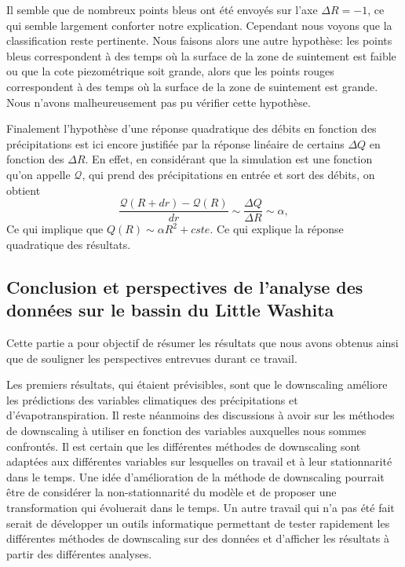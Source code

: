 \documentclass[a4paper,11pt]{article}
\numberwithin{equation}{section}
\begin{document}
Il semble que de nombreux points bleus ont été  envoyés sur l'axe $\Delta R=-1$, ce qui semble largement conforter notre explication. Cependant nous voyons que la classification reste pertinente. Nous faisons alors une autre hypothèse: les points bleus correspondent à des temps où la surface de la zone de suintement est faible ou que la cote piezométrique soit grande, alors que les points rouges correspondent à des temps où la surface de la zone de suintement est grande. Nous n'avons malheureusement pas pu vérifier cette hypothèse.

Finalement l'hypothèse d'une réponse quadratique des débits en fonction des précipitations est ici encore justifiée par la réponse linéaire de certains $\Delta Q$ en fonction des $\Delta R$.
En effet, en considérant que la simulation est une fonction qu'on appelle $\mathcal{Q}$, qui prend des précipitations en entrée et sort des débits, on obtient \[\frac{\mathcal{Q}(R+dr)-\mathcal{Q}(R)}{dr}\sim \frac{\Delta Q}{\Delta R}\sim \alpha,\]
Ce qui implique que $Q(R)\sim \alpha R^2 + cste$.
Ce qui explique la réponse quadratique des résultats.


\subsection{Conclusion et perspectives de l'analyse des données sur le bassin du Little Washita} 

Cette partie a pour objectif de résumer les résultats que nous avons obtenus ainsi que de souligner les perspectives entrevues durant ce travail.

\vspace{0.7cm}

Les premiers résultats, qui étaient prévisibles, sont que le downscaling améliore les prédictions des variables climatiques des précipitations et d'évapotranspiration. Il reste néanmoins des discussions à avoir sur les méthodes de downscaling à utiliser en fonction des variables auxquelles nous sommes confrontés. Il est certain que les différentes méthodes de downscaling sont adaptées aux différentes variables sur lesquelles on travail et à leur stationnarité dans le temps. Une idée d'amélioration de la méthode de downscaling pourrait être de considérer la non-stationnarité du modèle et de proposer une transformation qui évoluerait dans le temps. Un autre travail qui n'a pas été fait serait de développer un outils informatique permettant de tester rapidement les différentes méthodes de downscaling sur des données et d'afficher les résultats à partir des différentes analyses.
\end{document}
